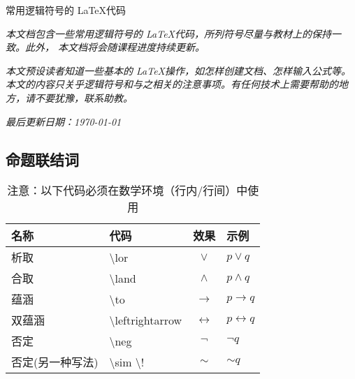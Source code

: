 \documentclass[UTF8,12pt,a4paper]{ctexart}
\begin{document}
	

\begin{center}
常用逻辑符号的 \LaTeX 代码 
\end{center}


\textit{本文档包含一些常用逻辑符号的 \LaTeX 代码，所列符号尽量与教材上的保持一致。此外，
本文档将会随课程进度持续更新。}

\textit{本文预设读者知道一些基本的 \LaTeX 操作，如怎样创建文档、怎样输入公式等。本文的内容只关乎逻辑符号和与之相关的注意事项。有任何技术上需要帮助的地方，请不要犹豫，联系助教。}

\textit{最后更新日期：\today}



\subsection*{命题联结词}

\begin{table}[h]
	\centering
	\caption{ 注意：以下代码必须在数学环境（行内/行间）中使用 } 
	\begin{tabular}{l l c l}
		\hline 
		\hline
		名称 & 代码 & 效果 & 示例\\
		\hline
		
		析取 & \textbackslash lor &  $\lor$ &$p \lor q$ \\
		
		合取 & \textbackslash land &  $\land$ &$p \land q$ \\
		
		蕴涵 & \textbackslash to &  $\to$ &$p \to q$ \\
		
		双蕴涵 & \textbackslash leftrightarrow &  $\leftrightarrow$ &$p \leftrightarrow q$ \\ 
		
		否定 & \textbackslash neg &  $\neg$ & $ \neg q $ \\
		
		否定(另一种写法) & \textbackslash sim \textbackslash! &  $\sim$ & $ \sim\! q $ \\
		\hline
		\hline
	\end{tabular}
\end{table}
\end{document}
